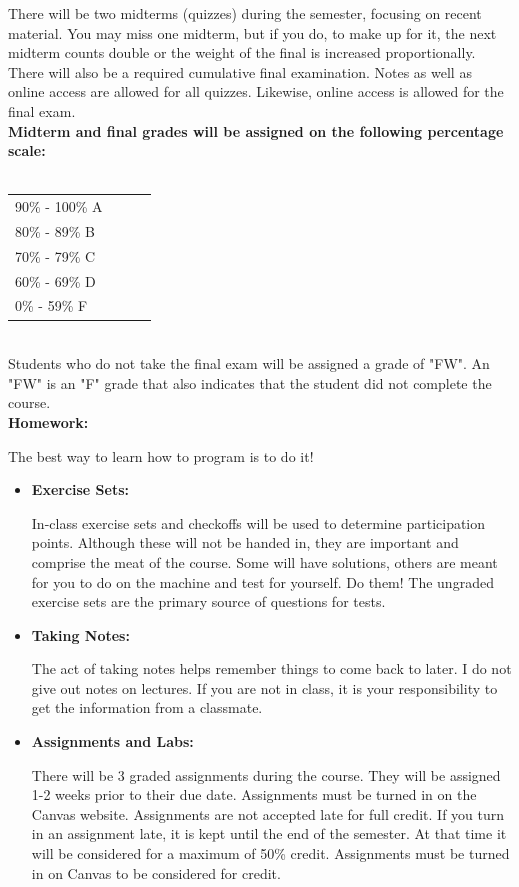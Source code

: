 \documentclass[11pt]{article}
\begin{document}
There will be two midterms (quizzes) during the semester, focusing on recent
material. You may miss one midterm, but if you do, to make up for it, the next
midterm counts double or the weight of the final is increased proportionally.
There will also be a required cumulative final examination. Notes as well as
online access are allowed for all quizzes. Likewise, online access is allowed
for the final exam.\\

\textbf {\large Midterm and final grades will be assigned on the following percentage scale:} \\\\
\hspace*{40mm}
\begin{tabular}{ l l | l l }
90\% - 100\% A \\
80\% - 89\% B \\
70\% - 79\% C \\
60\% - 69\% D \\
0\% - 59\% F \\
\end{tabular} \\

Students who do not take the final exam will be assigned a grade of "FW". An "FW" is an "F" grade that also indicates that the student did not complete the course.\\


\textbf {\large Homework:}

The best way to learn how to program is to do it!

\begin{itemize}
	\item \textbf {Exercise Sets:}

In-class exercise sets and checkoffs will be used to determine participation points. Although these will not be handed in, they are
important and comprise the meat of the course. Some will have solutions, others
are meant for you to do on the machine and test for yourself. Do them! The
ungraded exercise sets are the primary source of questions for tests.

	\item \textbf {Taking Notes:}

The act of taking notes helps remember things to come back to later. I do not give out notes on lectures. If you are not in class, it is your responsibility to get the information from a classmate.

        \item \textbf {Assignments and Labs:}

There will be 3 graded assignments during the course. They will be assigned 1-2
weeks prior to their due date.  Assignments must be turned in on the Canvas
website. Assignments are not accepted late for full credit. If you turn in an
assignment late, it is kept until the end of the semester. At that time it will
be considered for a maximum of 50\% credit.  Assignments must be turned in on
Canvas to be considered for credit.

\end{itemize}
\end{document}
